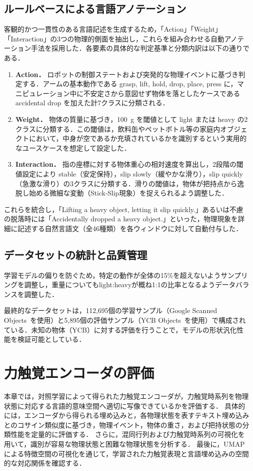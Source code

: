 \documentclass[Japanese]{dicomopapers}
\begin{document}
\subsection{ルールベースによる言語アノテーション}
\label{subsec:annotation}
客観的かつ一貫性のある言語記述を生成するため，「Action」「Weight」「Interaction」の3つの物理的側面を抽出し，これらを組み合わせる自動アノテーション手法を採用した．各要素の具体的な判定基準と分類内訳は以下の通りである．

\begin{enumerate}
    \item \textbf{Action．} ロボットの制御ステートおよび突発的な物理イベントに基づき判定する．アームの基本動作である grasp, lift, hold, drop, place, press に，マニピュレーション中に不安定さから意図せず物体を落としたケースである accidental drop を加えた計7クラスに分類される．
    \item \textbf{Weight．} 物体の質量に基づき，\qty{100}{g} を閾値として light または heavy の2クラスに分類する．この閾値は，飲料缶やペットボトル等の家庭内オブジェクトにおいて，中身が空であるか充填されているかを識別するという実用的なユースケースを想定して設定した．
    \item \textbf{Interaction．} 指の座標に対する物体重心の相対速度を算出し，2段階の閾値設定により stable（安定保持），slip slowly（緩やかな滑り），slip quickly（急激な滑り）の3クラスに分類する．滑りの閾値は，物体が把持点から逸脱し始める微細な変動（Stick-Slip現象）を捉えられるよう調整した．
\end{enumerate}

これらを統合し，「Lifting a heavy object, letting it slip quickly.」あるいは不慮の脱落時には「Accidentally dropped a heavy object.」といった，物理現象を詳細に記述する自然言語文（全46種類）を各ウィンドウに対して自動付与した．

\subsection{データセットの統計と品質管理}
学習モデルの偏りを防ぐため，特定の動作が全体の15\%を超えないようサンプリングを調整し，重量についてもlight:heavyが概ね1:1の比率となるようデータバランスを調整した．

最終的なデータセットは，112,695個の学習サンプル（Google Scanned Objects~\cite{GoogleScanObject}を使用）と5,895個の評価サンプル（YCB Objects~\cite{YCB}を使用）で構成されている．未知の物体（YCB）に対する評価を行うことで，モデルの形状汎化性能を検証可能としている．

\section{力触覚エンコーダの評価}
\label{sec:eval}
本章では，対照学習によって得られた力触覚エンコーダが，力触覚時系列を物理状態に対応する言語的意味空間へ適切に写像できているかを評価する．
具体的には，エンコーダから得られる埋め込みと，各物理状態を表すテキスト埋め込みとのコサイン類似度に基づき，物理イベント，物体の重さ，および把持状態の分類性能を定量的に評価する．
さらに，混同行列および力触覚時系列の可視化を用いて，識別が容易な物理状態と困難な物理状態を分析する．
最後に，UMAPによる特徴空間の可視化を通じて，学習された力触覚表現と言語埋め込みの空間的な対応関係を確認する．
\end{document}
